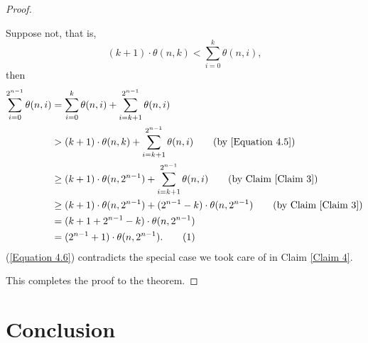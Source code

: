\documentclass[12pt]{ucthesis}
\newcommand\numberthis{\addtocounter{equation}{1}\tag{\theequation}}
\theoremstyle{plain}
\theoremstyle{definition}
\begin{document}
\begin{proof}
\begin{enumerate}[(1)]
	Suppose not, that is,
	\begin{equation}
	\label{Equation 4.5}
	(k + 1) \cdot \theta(n, k) < \sum_{i = 0}^k \theta(n, i),
	\end{equation}
	then
	\begin{align*}
	\sum_{i = 0}^{2^{n - 1}} \theta(n, i)
	& = \sum_{i = 0}^k \theta(n, i) + \sum_{i = k + 1}^{2^{n - 1}} \theta(n, i) \\
	& > (k + 1) \cdot \theta(n, k) + \sum_{i = k + 1}^{2^{n - 1}} \theta(n, i) \tag{by \ref{Equation 4.5}} \\
	& \ge (k + 1) \cdot \theta(n, 2^{n - 1}) + \sum_{i = k + 1}^{2^{n - 1}} \theta(n, i) \tag{by Claim \ref{Claim 3}} \\
	& \ge (k + 1) \cdot \theta(n, 2^{n - 1}) + (2^{n - 1} - k) \cdot \theta(n, 2^{n - 1}) \tag{by Claim \ref{Claim 3}} \\
	& = (k + 1 + 2^{n - 1} - k) \cdot \theta(n, 2^{n - 1}) \\
	& = (2^{n - 1} + 1) \cdot \theta(n, 2^{n - 1}). \numberthis \label{Equation 4.6}
	\end{align*}
	(\ref{Equation 4.6}) contradicts the special case we took care of in Claim \ref{Claim 4}.
\end{enumerate}
This completes the proof to the theorem.
\end{proof}

\chapter{Conclusion}
\label{Chapter 5}
\end{document}

